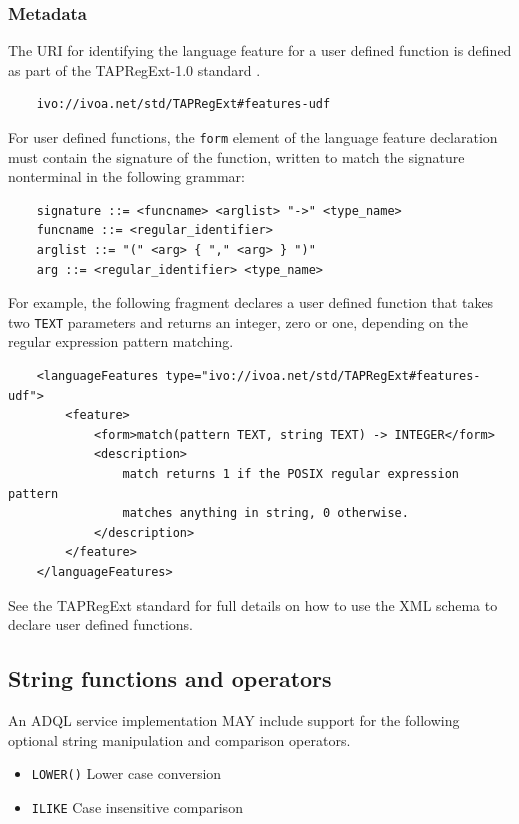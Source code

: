 \documentclass[11pt,a4paper]{ivoa}
\begin{document}
\subsubsection{Metadata}
\label{sec:user.metadata}

The URI for identifying the language feature for a user defined function
is defined as part of the TAPRegExt-1.0 standard \citep{std:TAPREGEXT}.

\begin{verbatim}
    ivo://ivoa.net/std/TAPRegExt#features-udf
\end{verbatim}

For user defined functions, the \verb:form: element of the language feature
declaration must contain the signature of the function, written to match
the signature nonterminal in the following grammar:

\begin{verbatim}
    signature ::= <funcname> <arglist> "->" <type_name>
    funcname ::= <regular_identifier>
    arglist ::= "(" <arg> { "," <arg> } ")"
    arg ::= <regular_identifier> <type_name>
\end{verbatim}

For example, the following fragment declares a user defined function that
takes two \verb:TEXT: parameters and returns an integer, zero or one,
depending on the regular expression pattern matching.

\begin{verbatim}
    <languageFeatures type="ivo://ivoa.net/std/TAPRegExt#features-udf">
        <feature>
            <form>match(pattern TEXT, string TEXT) -> INTEGER</form>
            <description>
                match returns 1 if the POSIX regular expression pattern
                matches anything in string, 0 otherwise.
            </description>
        </feature>
    </languageFeatures>
\end{verbatim}

See the TAPRegExt standard for full details on how to use the
XML schema to declare user defined functions.

\subsection{String functions and operators}
\label{sec:string.functions}

An ADQL service implementation MAY include support for the following optional
string manipulation and comparison operators.

\begin{itemize}
    \item \verb:LOWER(): Lower case conversion
    \item \verb:ILIKE: Case insensitive comparison
\end{itemize}
\end{document}
